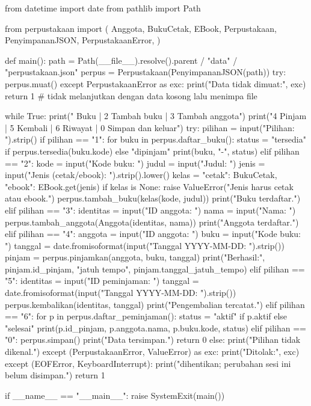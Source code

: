 \begin{kode}[main.py]
from datetime import date
from pathlib import Path

from perpustakaan import (
    Anggota, BukuCetak, EBook, Perpustakaan,
    PenyimpananJSON, PerpustakaanError,
)


def main():
    path = Path(__file__).resolve().parent / "data" / "perpustakaan.json"
    perpus = Perpustakaan(PenyimpananJSON(path))
    try:
        perpus.muat()
    except PerpustakaanError as exc:
        print("Data tidak dimuat:", exc)
        return 1  # tidak melanjutkan dengan data kosong lalu menimpa file

    while True:
        print(" Buku | 2 Tambah buku | 3 Tambah anggota")
        print("4 Pinjam | 5 Kembali | 6 Riwayat | 0 Simpan dan keluar")
        try:
            pilihan = input("Pilihan: ").strip()
            if pilihan == "1":
                for buku in perpus.daftar_buku():
                    status = "tersedia" if perpus.tersedia(buku.kode) else "dipinjam"
                    print(buku, "-", status)
            elif pilihan == "2":
                kode = input("Kode buku: ")
                judul = input("Judul: ")
                jenis = input("Jenis (cetak/ebook): ").strip().lower()
                kelas = {"cetak": BukuCetak, "ebook": EBook}.get(jenis)
                if kelas is None:
                    raise ValueError("Jenis harus cetak atau ebook.")
                perpus.tambah_buku(kelas(kode, judul))
                print("Buku terdaftar.")
            elif pilihan == "3":
                identitas = input("ID anggota: ")
                nama = input("Nama: ")
                perpus.tambah_anggota(Anggota(identitas, nama))
                print("Anggota terdaftar.")
            elif pilihan == "4":
                anggota = input("ID anggota: ")
                buku = input("Kode buku: ")
                tanggal = date.fromisoformat(input("Tanggal YYYY-MM-DD: ").strip())
                pinjam = perpus.pinjamkan(anggota, buku, tanggal)
                print("Berhasil:", pinjam.id_pinjam,
                      "jatuh tempo", pinjam.tanggal_jatuh_tempo)
            elif pilihan == "5":
                identitas = input("ID peminjaman: ")
                tanggal = date.fromisoformat(input("Tanggal YYYY-MM-DD: ").strip())
                perpus.kembalikan(identitas, tanggal)
                print("Pengembalian tercatat.")
            elif pilihan == "6":
                for p in perpus.daftar_peminjaman():
                    status = "aktif" if p.aktif else "selesai"
                    print(p.id_pinjam, p.anggota.nama, p.buku.kode, status)
            elif pilihan == "0":
                perpus.simpan()
                print("Data tersimpan.")
                return 0
            else:
                print("Pilihan tidak dikenal.")
        except (PerpustakaanError, ValueError) as exc:
            print("Ditolak:", exc)
        except (EOFError, KeyboardInterrupt):
            print("\nInput dihentikan; perubahan sesi ini belum disimpan.")
            return 1


if __name__ == "__main__":
    raise SystemExit(main())
\end{kode}

